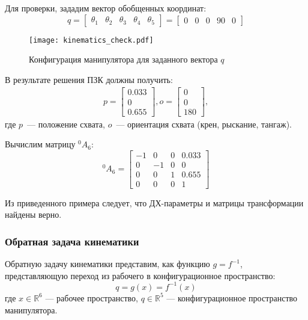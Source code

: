 Для проверки, зададим вектор обобщенных координат:
\begin{equation}
	q =
	\begin{bmatrix}
	\theta_1 & \theta_2 & \theta_3 & \theta_4 & \theta_5
	\end{bmatrix}
	=
	\begin{bmatrix}
	0 & 0 & 0 & 90 & 0
	\end{bmatrix}
\end{equation}

\begin{figure}[h]
	\centering
	\texttt{[image: kinematics\_check.pdf]}
	\caption{Конфигурация манипулятора для заданного вектора $q$}
	\label{kinematics_check}
\end{figure}

В результате решения ПЗК должны получить:
\begin{align*}
	p = 
	\begin{bmatrix}
		0.033\\
		0\\
		0.655 
	\end{bmatrix},
	o =
	\begin{bmatrix}
		0\\
		0\\
		180
	\end{bmatrix}, 
\end{align*}
где $p$~--- положение схвата, $o$~--- ориентация схвата (крен, рыскание, тангаж).

Вычислим матрицу $^0A_6$:
\begin{equation}
	^0A_6 = 
	\left[\begin{matrix}-1 & 0 & 0 & 0.033\\0 & -1 & 0 & 0\\0 & 0 & 1 & 0.655\\0 & 0 & 0 & 1\end{matrix}\right]
\end{equation}

Из приведенного примера следует, что ДХ-параметры и матрицы трансформации найдены верно.

\subsubsection{Обратная задача кинематики}\label{part_kinematics_inverse}
Обратную задачу кинематики представим, как функцию $g = f^{-1}$, представляющую переход из рабочего в конфигурационное пространство:
\begin{equation}
q = g(x) = f^{-1}(x)
\end{equation}
где $x \in \mathbb{R}^6$ --- рабочее пространство, $q \in \mathbb{R}^5$ --- конфигурационное пространство манипулятора.




\newpage